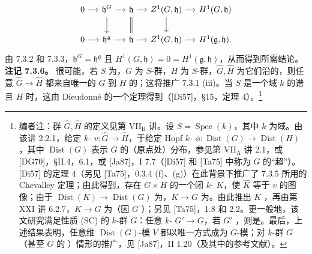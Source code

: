 \[\begin{tikzcd}[column sep=small]
0\arrow[r]&\mathfrak h^G\arrow[r]\arrow[d]&\mathfrak h\arrow[r]\arrow[d,equal]&Z^1(G,\mathfrak h)\arrow[r]\arrow[d]&H^1(G,\mathfrak h)\\
0\arrow[r]&\mathfrak h^{\mathfrak g}\arrow[r]&\mathfrak h\arrow[r]&Z^1(G,\mathfrak h)\arrow[r]&H^1(\mathfrak g,\mathfrak h).
\end{tikzcd}\]
由 7.3.2 和 7.3.3，$\mathfrak h^G=\mathfrak h^{\mathfrak g}$ 且 $H^1(G,\mathfrak h)=0=H^1(\mathfrak g,\mathfrak h)$，从而得到所需结论。
\textbf{注记 7.3.6。} 很可能，若 $S$ 为，$G$ 为 $S$-群，$H$ 为 $S$-群，$\widehat G,\widehat H$ 为它们沿的，则任意 $\widehat G\to\widehat H$ 都来自唯一的 $G$ 到 $H$ 的；这将推广 7.3.1 (iii)。当 $S$ 是一个域 $k$ 的谱且 $H$ 时，这由 Dieudonné 的一个定理得到（[Di57]，\S 15，定理 4）。\footnote{编者注：群 $\widehat G,\widehat H$ 的定义见第 VII$_{\mathrm B}$ 讲。设 $S=\operatorname{Spec}(k)$，其中 $k$ 为域。由该讲 2.2.1，给定 $k$- $v:\widehat G\to\widehat H$，于给定 Hopf $k$- $\phi:\operatorname{Dist}(G)\to\operatorname{Dist}(H)$，其中 $\operatorname{Dist}(G)$ 表示 $G$ 的（原点处）分布，参见第 VII$_{\mathrm A}$ 讲 2.1，或 [DG70]，\S II.4，6.1，或 [Ja87]，I 7.7（[Di57] 和 [Ta75] 中称为 $G$ 的“超”）。[Di57] 的定理 4（另见 [Ta75]，0.3.4 (f)、(g)）在此背景下推广了 7.3.5 所用的 Chevalley 定理；由此得到，存在 $G\times H$ 的一个闭 $k$- $K$，使 $\widehat K$ 等于 $v$ 的图像；由于 $\operatorname{Dist}(K)\to\operatorname{Dist}(G)$ 为，$K\to G$ 为。由此推出 $K$ ，再由第 XXI 讲 6.2.7，$K\to G$ 为（因 $G$ ）；另见 [Ta75]，1.8 和 2.2。更一般地，该文研究满足性质 (SC) 的 $k$-群 $G$：任意 $k$- $G'\to G$，若 $G'$ ，则是。最后，上述结果表明，任意维 $\operatorname{Dist}(G)$-模 $V$ 都以唯一方式成为 $G$-模；对 $k$-群 $G$（甚至 $G$ 的 ）情形的推广，见 [Ja87]，II 1.20（及其中的参考文献）。}


